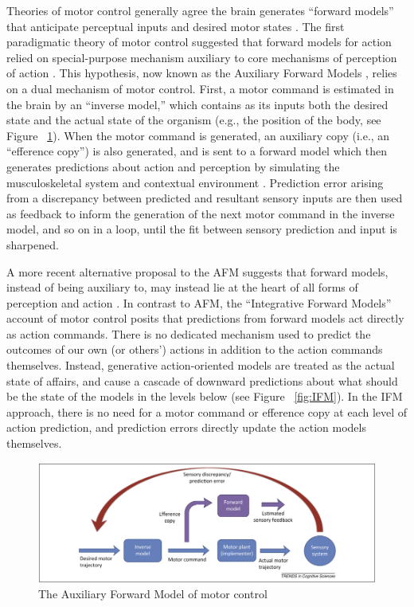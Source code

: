 \begin{CJK}{UTF8}{gbsn}
Theories of motor control generally agree the brain generates ``forward models'' that anticipate perceptual inputs and desired motor states \citep{Pickering2014}. The first paradigmatic theory of motor control suggested that forward models for action relied on special-purpose mechanism auxiliary to core mechanisms of perception of action \citep{Wolpert1997}.  This hypothesis, now known as the Auxiliary Forward Models \citep[AFM, see][]{Pickering2014}, relies on a dual mechanism of motor control.  First, a motor command is estimated in the brain by an ``inverse model,'' which contains as its inputs both the desired state and the actual state of the organism (e.g., the position of the body, see Figure ~\ref{fig:AFM}).  When the motor command is generated, an auxiliary copy (i.e., an ``efference copy'') is also generated, and is sent to a forward model which then generates predictions about action and perception by simulating the musculoskeletal system and contextual environment \citep{Wolpert1995,Blakemore1998,Flanagan2003}.  Prediction error arising from a discrepancy between predicted and resultant sensory inputs are then used as feedback to inform the generation of the next motor command in the inverse model, and so on in a loop, until the fit between sensory prediction and input is sharpened.

A more recent alternative proposal to the AFM suggests that forward models, instead of being auxiliary to, may instead lie at the heart of all forms of perception and action \citep{Friston2010}.  In contrast to AFM, the ``Integrative Forward Models'' account of motor control \citep[IFM, see][]{Pickering2014} posits that predictions from forward models act directly as action commands.  There is no dedicated mechanism used to predict the outcomes of our own (or others') actions in addition to the action commands themselves.  Instead, generative action-oriented models are treated as the actual state of affairs, and cause a cascade of downward predictions about what should be the state of the models in the levels below (see Figure ~\ref{fig:IFM}).  In the IFM approach, there is no need for a motor command or efference copy at each level of action prediction, and prediction errors directly update the action models themselves.


\begin{figure}[htbp]
  \begin{center}
    \includegraphics[scale=.3]{images/AFM.png}
      \caption{The Auxiliary Forward Model of motor control}
        \label{fig:AFM}
   \end{center}
\end{figure}


\end{CJK}
